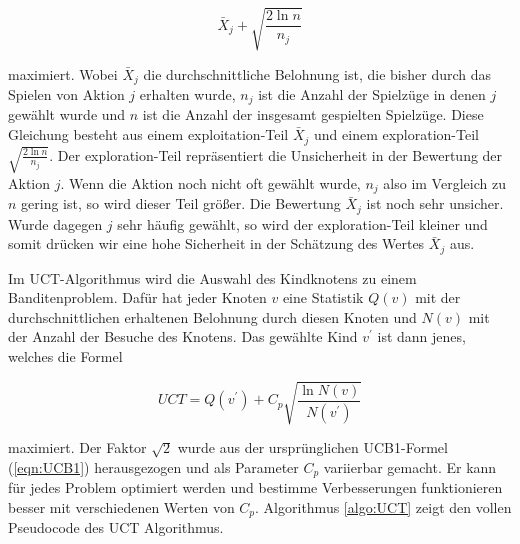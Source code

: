 \begin{equation}
\bar{X}_j + \sqrt{\frac{2\ln n}{n_j}}
\label{eqn:UCB1}
\end{equation}

maximiert. Wobei $\bar{X}_j$ die durchschnittliche Belohnung ist, die bisher durch das Spielen von Aktion $j$ erhalten wurde, $n_j$ ist die Anzahl der Spielzüge in denen $j$ gewählt wurde und $n$ ist die Anzahl der insgesamt gespielten Spielzüge. Diese Gleichung besteht aus einem exploitation-Teil $\bar{X}_j$ und einem exploration-Teil $\sqrt{\frac{2\ln n}{n_j}}$. Der exploration-Teil repräsentiert die Unsicherheit in der Bewertung der Aktion $j$. Wenn die Aktion noch nicht oft gewählt wurde, $n_j$ also im Vergleich zu $n$ gering ist, so wird dieser Teil größer. Die Bewertung $\bar{X}_j$ ist noch sehr unsicher. Wurde dagegen $j$ sehr häufig gewählt, so wird der exploration-Teil kleiner und somit drücken wir eine hohe Sicherheit in der Schätzung des Wertes $\bar{X}_j$ aus.

Im UCT-Algorithmus wird die Auswahl des Kindknotens zu einem Banditenproblem. Dafür hat jeder Knoten $v$ eine Statistik $Q(v)$ mit der durchschnittlichen erhaltenen Belohnung durch diesen Knoten und $N(v)$ mit der Anzahl der Besuche des Knotens. Das gewählte Kind $v^\prime$ ist dann jenes, welches die Formel

\begin{equation}
UCT = Q(v^\prime) + C_p\sqrt{\frac{\ln N(v)}{N(v^\prime)}}
\label{eqn:UCT}
\end{equation}

maximiert. Der Faktor $\sqrt{2}$ wurde aus der ursprünglichen UCB1-Formel (\ref{eqn:UCB1}) herausgezogen und als Parameter $C_p$ variierbar gemacht. Er kann für jedes Problem optimiert werden und bestimme Verbesserungen funktionieren besser mit verschiedenen Werten von $C_p$. Algorithmus \ref{algo:UCT} zeigt den vollen Pseudocode des UCT Algorithmus.


